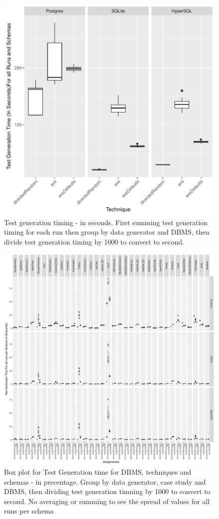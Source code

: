 \documentclass[runningheads,a4paper]{llncs}
\begin{document}
\begin{figure}[htbp]
\centering
\includegraphics{../plots/figure3.pdf}
\caption{Test generation timing - in seconds. First summing test
generation timing for each run then group by data generator and DBMS,
then divide test generation timing by 1000 to convert to second.}
\end{figure}

\begin{figure}[htbp]
\centering
\includegraphics{../plots/figure4.pdf}
\caption{Box plot for Test Generation time for DBMS, techniques and
schemas - in precentage. Group by data generator, case study and DBMS,
then dividing test generation timning by 1000 to convert to second. No
averaging or summing to see the spread of values for all runs per
schema}
\end{figure}
\end{document}
